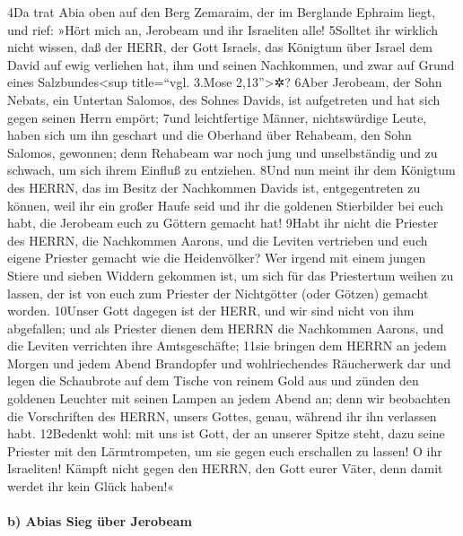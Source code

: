4Da trat Abia oben auf den Berg Zemaraim, der im Berglande Ephraim
liegt, und rief: »Hört mich an, Jerobeam und ihr Israeliten alle!
5Solltet ihr wirklich nicht wissen, daß der HERR, der Gott Israels, das
Königtum über Israel dem David auf ewig verliehen hat, ihm und seinen
Nachkommen, und zwar auf Grund eines Salzbundes\textless sup
title=``vgl. 3.Mose 2,13''\textgreater✲? 6Aber Jerobeam, der Sohn
Nebats, ein Untertan Salomos, des Sohnes Davids, ist aufgetreten und hat
sich gegen seinen Herrn empört; 7und leichtfertige Männer, nichtswürdige
Leute, haben sich um ihn geschart und die Oberhand über Rehabeam, den
Sohn Salomos, gewonnen; denn Rehabeam war noch jung und unselbständig
und zu schwach, um sich ihrem Einfluß zu entziehen. 8Und nun meint ihr
dem Königtum des HERRN, das im Besitz der Nachkommen Davids ist,
entgegentreten zu können, weil ihr ein großer Haufe seid und ihr die
goldenen Stierbilder bei euch habt, die Jerobeam euch zu Göttern gemacht
hat! 9Habt ihr nicht die Priester des HERRN, die Nachkommen Aarons, und
die Leviten vertrieben und euch eigene Priester gemacht wie die
Heidenvölker? Wer irgend mit einem jungen Stiere und sieben Widdern
gekommen ist, um sich für das Priestertum weihen zu lassen, der ist von
euch zum Priester der Nichtgötter (oder Götzen) gemacht worden. 10Unser
Gott dagegen ist der HERR, und wir sind nicht von ihm abgefallen; und
als Priester dienen dem HERRN die Nachkommen Aarons, und die Leviten
verrichten ihre Amtsgeschäfte; 11sie bringen dem HERRN an jedem Morgen
und jedem Abend Brandopfer und wohlriechendes Räucherwerk dar und legen
die Schaubrote auf dem Tische von reinem Gold aus und zünden den
goldenen Leuchter mit seinen Lampen an jedem Abend an; denn wir
beobachten die Vorschriften des HERRN, unsers Gottes, genau, während ihr
ihn verlassen habt. 12Bedenkt wohl: mit uns ist Gott, der an unserer
Spitze steht, dazu seine Priester mit den Lärmtrompeten, um sie gegen
euch erschallen zu lassen! O ihr Israeliten! Kämpft nicht gegen den
HERRN, den Gott eurer Väter, denn damit werdet ihr kein Glück haben!«

\hypertarget{b-abias-sieg-uxfcber-jerobeam}{%
\paragraph{b) Abias Sieg über
Jerobeam}\label{b-abias-sieg-uxfcber-jerobeam}}

